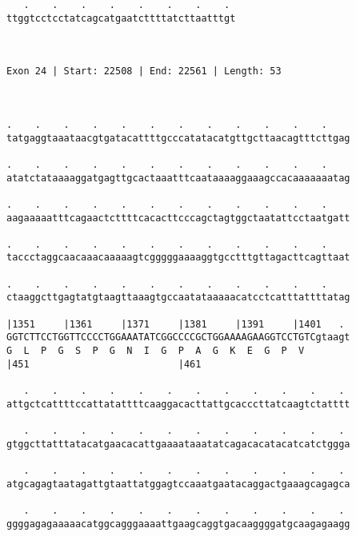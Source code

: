 \documentclass{article}
\begin{document}
\begin{Verbatim}
   .    .    .    .    .    .    .    . 
ttggtcctcctatcagcatgaatcttttatcttaatttgt
                                        
                                        
 
Exon 24 | Start: 22508 | End: 22561 | Length: 53



.    .    .    .    .    .    .    .    .    .    .    .    
tatgaggtaaataacgtgatacattttgcccatatacatgttgcttaacagtttcttgag
                                                            
.    .    .    .    .    .    .    .    .    .    .    .    
atatctataaaaggatgagttgcactaaatttcaataaaaggaaagccacaaaaaaatag
                                                            
.    .    .    .    .    .    .    .    .    .    .    .    
aagaaaaatttcagaactcttttcacacttcccagctagtggctaatattcctaatgatt
                                                            
.    .    .    .    .    .    .    .    .    .    .    .    
taccctaggcaacaaacaaaaagtcgggggaaaaggtgcctttgttagacttcagttaat
                                                            
.    .    .    .    .    .    .    .    .    .    .    .    
ctaaggcttgagtatgtaagttaaagtgccaatataaaaacatcctcatttattttatag
                                                            
|1351     |1361     |1371     |1381     |1391     |1401   . 
GGTCTTCCTGGTTCCCCTGGAAATATCGGCCCCGCTGGAAAAGAAGGTCCTGTCgtaagt
G  L  P  G  S  P  G  N  I  G  P  A  G  K  E  G  P  V        
|451                          |461                          
  
   .    .    .    .    .    .    .    .    .    .    .    . 
attgctcattttccattatattttcaaggacacttattgcacccttatcaagtctatttt
                                                            
   .    .    .    .    .    .    .    .    .    .    .    . 
gtggcttatttatacatgaacacattgaaaataaatatcagacacatacatcatctggga
                                                            
   .    .    .    .    .    .    .    .    .    .    .    . 
atgcagagtaatagattgtaattatggagtccaaatgaatacaggactgaaagcagagca
                                                            
   .    .    .    .    .    .    .    .    .    .    .    . 
ggggagagaaaaacatggcagggaaaattgaagcaggtgacaaggggatgcaagagaagg
                                                            

\end{Verbatim}
\end{document}
